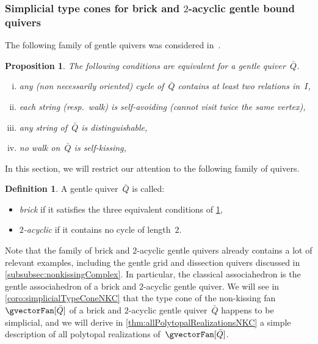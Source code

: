 \documentclass{amsart}
\newtheorem{proposition}[theorem]{Proposition}
\theoremstyle{definition}
\newtheorem{definition}[theorem]{Definition}
\newcommand{\darkblue}{\color{darkblue}} %
\newcommand{\defn}[1]{\textsl{\darkblue #1}} %
\newcommand{\quiver}{\bar Q} %
\begin{document}

\subsubsection{Simplicial type cones for brick and $2$-acyclic gentle bound quivers}
\label{subsubsec:simplicialTypeConeNKC}

The following family of gentle quivers was considered in~\cite[Sect.~4]{GarverMcConvilleMousavand}.

\begin{proposition}
\label{prop:noSelfKissing}
The following conditions are equivalent for a gentle quiver~$\quiver$.
\begin{enumerate}[(i)]
\item any (non necessarily oriented) cycle of~$\quiver$ contains at least two relations in~$I$,
\item each string (resp.~walk) is self-avoiding (cannot visit twice the same vertex),
\item any string of~$\quiver$ is distinguishable,
\item no walk on~$\quiver$ is self-kissing,
\end{enumerate}
\end{proposition}

In this section, we will restrict our attention to the following family of quivers.

\begin{definition}
\label{def:brick2acyclic}
A gentle quiver~$\quiver$ is called:
\begin{itemize}
\item \defn{brick} if it satisfies the three equivalent conditions of \cref{prop:noSelfKissing},
\item \defn{$2$-acyclic} if it contains no cycle of length~$2$.
\end{itemize}
\end{definition}

Note that the family of brick and $2$-acyclic gentle quivers already contains a lot of relevant examples, including the gentle grid and dissection quivers discussed in \cref{subsubsec:nonkissingComplex}.
In particular, the classical associahedron is the gentle associahedron of a brick and $2$-acyclic gentle quiver.
We will see in \cref{coro:simplicialTypeConeNKC} that the type cone of the non-kissing fan~$\gvectorFan[\quiver]$ of a brick and $2$-acyclic gentle quiver~$\quiver$ happens to be simplicial, and we will derive in \cref{thm:allPolytopalRealizationsNKC} a simple description of all polytopal realizations of~$\gvectorFan[\quiver]$.
\end{document}
